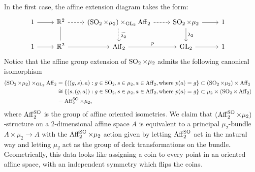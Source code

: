 \documentclass{../../templates/lkx_pset}
\begin{document}
\begin{parts}
	In the first case, the affine extension diagram takes the form:
	\[\begin{tikzcd}
			1 & {\R^2} & {(\SO_2\times\mu_2)\times_{\GL_2}\Aff_2} & {\SO_2\times\mu_2} & 1 \\
			1 & {\R^2} & {\Aff_2} & {\GL_2} & 1
			\arrow[from=1-1, to=1-2]
			\arrow[dashed, from=1-2, to=1-3]
			\arrow[no head, from=1-2, to=2-2]
			\arrow[dashed, from=1-3, to=1-4]
			\arrow["{\widetilde{\lambda_2}}", dashed, from=1-3, to=2-3]
			\arrow[from=1-4, to=1-5]
			\arrow["{\lambda_2}", from=1-4, to=2-4]
			\arrow[from=2-1, to=2-2]
			\arrow[from=2-2, to=2-3]
			\arrow["{p}", from=2-3, to=2-4]
			\arrow[from=2-4, to=2-5]
		\end{tikzcd}\]
  Notice that the affine group extension of $\operatorname{SO}_2\times \mu_2$ admits the following canonical isomorphism 
  \[
    \begin{aligned}
      (\operatorname{SO}_2\times\mu_2)\times_{\operatorname{GL}_2} \operatorname{Aff}_2 
      &=\{ ((g,s), a) : g\in \operatorname{SO}_2, s\in \mu_2, a\in \operatorname{Aff}_2, \textrm{where } p(a)=g \}\subset (\operatorname{SO}_2\times \mu_2)\times \operatorname{Aff}_2\\
      &\cong\{ (s,(g, a)) : g\in \operatorname{SO}_2, s\in \mu_2, a\in \operatorname{Aff}_2, \textrm{where } p(a)=g \} \subset \mu_2\times(\operatorname{SO}_2\times \operatorname{Aff}_2)\\
      &=\operatorname{Aff}^{\operatorname{SO}}_2 \times\mu_2,
    \end{aligned}
  \]
  where $\operatorname{Aff}^{\operatorname{SO}}_2$ is the group of affine oriented isometries. We claim that $(\operatorname{Aff}^{\operatorname{SO}}_2\times \mu_2)$-structure on a $2$-dimensional affine space $A$ is equivalent to a principal $\mu_2$-bundle $A\times\mu_2 \to A$ with the $\operatorname{Aff}^{\operatorname{SO}}_2\times \mu_2$ action given by letting $\operatorname{Aff}^{\operatorname{SO}}_2$ act in the natural way and letting $\mu_2$ act as the group of deck transformations on the bundle. Geometrically, this data looks like assigning a coin to every point in an oriented affine space, with an independent symmetry which flips the coins.


\end{parts}
\end{document}
